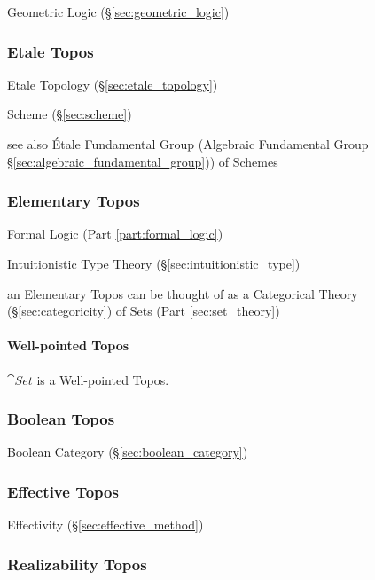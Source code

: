 Geometric Logic (\S\ref{sec:geometric_logic})



\subsubsection{Etale Topos}\label{sec:etale_topos}

Etale Topology (\S\ref{sec:etale_topology})

Scheme (\S\ref{sec:scheme})

see also \'Etale Fundamental Group (Algebraic Fundamental Group
\S\ref{sec:algebraic_fundamental_group})) of Schemes



\subsubsection{Elementary Topos}\label{sec:elementary_topos}

Formal Logic (Part \ref{part:formal_logic})

Intuitionistic Type Theory (\S\ref{sec:intuitionistic_type})

an Elementary Topos can be thought of as a Categorical Theory
(\S\ref{sec:categoricity}) of Sets (Part \ref{sec:set_theory})



\paragraph{Well-pointed Topos}\label{sec:wellpointed_topos}\hfill

$\cat{Set}$ is a Well-pointed Topos.



\subsubsection{Boolean Topos}\label{sec:boolean_topos}

Boolean Category (\S\ref{sec:boolean_category})



\subsubsection{Effective Topos}\label{sec:effective_topos}

Effectivity (\S\ref{sec:effective_method})



\subsubsection{Realizability Topos}\label{sec:realizability_topos}

